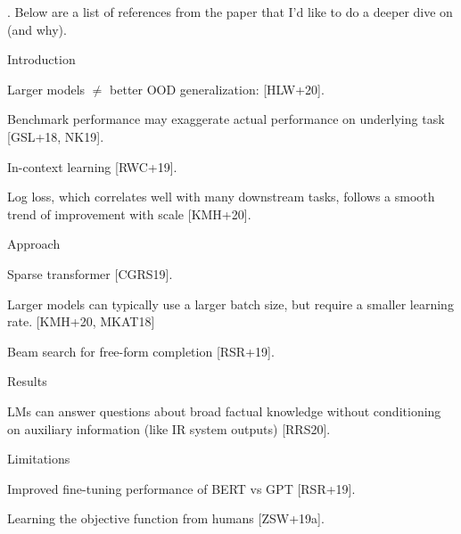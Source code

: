\documentclass[11pt]{article}
\begin{document}
. Below are a list of references from the paper that I'd like to do a deeper dive on (and why).
\begin{compactitem}
    \item Introduction
    \begin{compactitem}
        \item Larger models $\ne$ better OOD generalization: [HLW+20].
        \item Benchmark performance may exaggerate actual performance on underlying task [GSL+18, NK19].
        \item In-context learning [RWC+19].
        \item Log loss, which correlates well with many downstream tasks, follows a smooth trend of improvement with scale [KMH+20].
    \end{compactitem}

    \item Approach
    \begin{compactitem}
        \item Sparse transformer [CGRS19].
        \item Larger models can typically use a larger batch size, but require a smaller learning rate. [KMH+20, MKAT18]    
        \item Beam search for free-form completion [RSR+19].
    \end{compactitem}

    \item Results
    \begin{compactitem}
        \item LMs can answer questions about broad factual knowledge without conditioning on auxiliary information (like IR system outputs) [RRS20].
    \end{compactitem}

    \item Limitations
    \begin{compactitem}
        \item Improved fine-tuning performance of BERT vs GPT [RSR+19].
        \item Learning the objective function from humans [ZSW+19a].
    \end{compactitem}
\end{compactitem}







\end{document}
